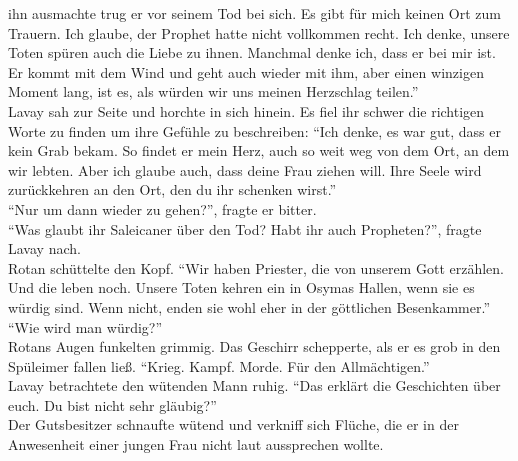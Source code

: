 ihn ausmachte trug er vor seinem Tod bei sich. Es gibt für mich keinen Ort zum Trauern. Ich 
glaube, der Prophet hatte nicht vollkommen recht. Ich denke, unsere Toten spüren auch die Liebe 
zu ihnen. Manchmal denke ich, dass er bei mir ist. Er kommt mit dem Wind und geht auch wieder 
mit ihm, aber einen winzigen Moment lang, ist es, als würden wir uns meinen Herzschlag teilen.''\\
Lavay sah zur Seite und horchte in sich hinein. Es fiel ihr schwer die richtigen Worte zu finden um 
ihre Gefühle zu beschreiben: ``Ich denke, es war gut, dass er kein Grab bekam. So findet er mein 
Herz, auch so weit weg von dem Ort, an dem wir lebten. Aber ich glaube auch, dass deine Frau ziehen 
will. Ihre Seele wird zurückkehren an den Ort, den du ihr schenken wirst.''\\
``Nur um dann wieder zu gehen?'', fragte er bitter.\\
``Was glaubt ihr Saleicaner über den Tod? Habt ihr auch Propheten?'', fragte Lavay nach.\\
Rotan schüttelte den Kopf. ``Wir haben Priester, die von unserem Gott erzählen. Und die leben noch. 
Unsere Toten kehren ein in Osymas Hallen, wenn sie es würdig sind. Wenn nicht, enden sie wohl eher 
in der göttlichen Besenkammer.''\\
``Wie wird man würdig?''\\
Rotans Augen funkelten grimmig. Das Geschirr schepperte, als er es grob in den Spüleimer fallen 
ließ. ``Krieg. Kampf. Morde. Für den Allmächtigen.''\\
Lavay betrachtete den wütenden Mann ruhig. ``Das erklärt die Geschichten über euch. Du bist nicht 
sehr gläubig?''\\
Der Gutsbesitzer schnaufte wütend und verkniff sich Flüche, die er in der Anwesenheit einer jungen 
Frau nicht laut aussprechen wollte.\\

